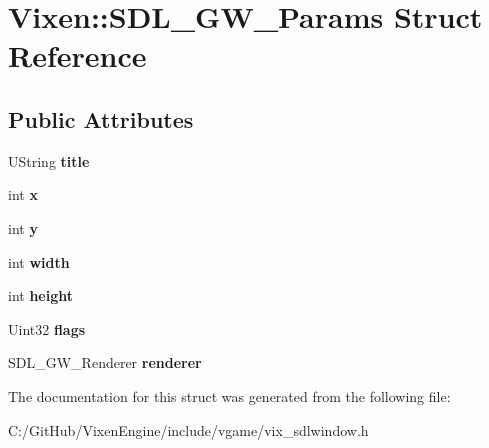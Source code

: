 \hypertarget{struct_vixen_1_1_s_d_l___g_w___params}{}\section{Vixen\+:\+:S\+D\+L\+\_\+\+G\+W\+\_\+\+Params Struct Reference}
\label{struct_vixen_1_1_s_d_l___g_w___params}
\subsection*{Public Attributes}
\begin{DoxyCompactItemize}
\item 
\hypertarget{struct_vixen_1_1_s_d_l___g_w___params_a2a0ea31203bbfd556cf668c32a444de1}{}U\+String {\bfseries title}\label{struct_vixen_1_1_s_d_l___g_w___params_a2a0ea31203bbfd556cf668c32a444de1}

\item 
\hypertarget{struct_vixen_1_1_s_d_l___g_w___params_a94cd346595492b1dd702435a2c82fdfa}{}int {\bfseries x}\label{struct_vixen_1_1_s_d_l___g_w___params_a94cd346595492b1dd702435a2c82fdfa}

\item 
\hypertarget{struct_vixen_1_1_s_d_l___g_w___params_a4daab349a88a244bf7f8b4413b001aed}{}int {\bfseries y}\label{struct_vixen_1_1_s_d_l___g_w___params_a4daab349a88a244bf7f8b4413b001aed}

\item 
\hypertarget{struct_vixen_1_1_s_d_l___g_w___params_aa942559b60890994214b4e9b19092a05}{}int {\bfseries width}\label{struct_vixen_1_1_s_d_l___g_w___params_aa942559b60890994214b4e9b19092a05}

\item 
\hypertarget{struct_vixen_1_1_s_d_l___g_w___params_a6f01c877965d39af2dd6ff540bf81de5}{}int {\bfseries height}\label{struct_vixen_1_1_s_d_l___g_w___params_a6f01c877965d39af2dd6ff540bf81de5}

\item 
\hypertarget{struct_vixen_1_1_s_d_l___g_w___params_aedd8931621d64c044ebe7683c9748d43}{}Uint32 {\bfseries flags}\label{struct_vixen_1_1_s_d_l___g_w___params_aedd8931621d64c044ebe7683c9748d43}

\item 
\hypertarget{struct_vixen_1_1_s_d_l___g_w___params_a6a131712e21432646dff194ee5765638}{}S\+D\+L\+\_\+\+G\+W\+\_\+\+Renderer {\bfseries renderer}\label{struct_vixen_1_1_s_d_l___g_w___params_a6a131712e21432646dff194ee5765638}

\end{DoxyCompactItemize}


The documentation for this struct was generated from the following file\+:\begin{DoxyCompactItemize}
\item 
C\+:/\+Git\+Hub/\+Vixen\+Engine/include/vgame/vix\+\_\+sdlwindow.\+h\end{DoxyCompactItemize}
